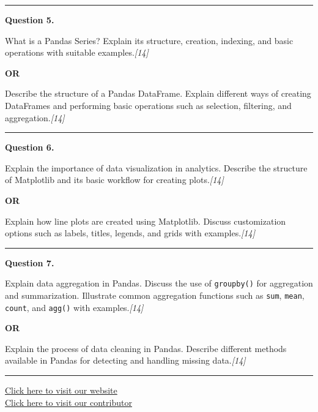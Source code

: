 \documentclass[11pt,a4paper]{article}
\newcommand{\pts}[1]{\hfill   \textit{[#1]}}
\begin{document}
\medskip\rule{\linewidth}{0.2pt}\medskip




\noindent   \textbf{Question 5.}

\begin{parts}
  \item What is a Pandas Series? Explain its structure, creation, indexing, and basic operations with suitable examples.\pts{14}
\end{parts}
\centerline{   \textbf{OR}}

\begin{parts}
  \item Describe the structure of a Pandas DataFrame. Explain different ways of creating DataFrames and performing basic operations such as selection, filtering, and aggregation.\pts{14}
\end{parts}

\medskip\rule{\linewidth}{0.2pt}\medskip




\noindent   \textbf{Question 6.}

\begin{parts}
  \item Explain the importance of data visualization in analytics. Describe the structure of Matplotlib and its basic workflow for creating plots.\pts{14}
\end{parts}
\centerline{   \textbf{OR}}

\begin{parts}
  \item Explain how line plots are created using Matplotlib. Discuss customization options such as labels, titles, legends, and grids with examples.\pts{14}
\end{parts}

\medskip\rule{\linewidth}{0.2pt}\medskip




\noindent   \textbf{Question 7.}

\begin{parts}
  \item Explain data aggregation in Pandas. Discuss the use of   \texttt{groupby()} for aggregation and summarization. Illustrate common aggregation functions such as   \texttt{sum},   \texttt{mean},   \texttt{count}, and   \texttt{agg()} with examples.\pts{14}
\end{parts}
\centerline{   \textbf{OR}}

\begin{parts}
  \item Explain the process of data cleaning in Pandas. Describe different methods available in Pandas for detecting and handling missing data.\pts{14}
\end{parts}

\vfill
\rule{\linewidth}{0.4pt}

\begin{center}\small
\href{https://bhu-exam.vercel.app/}{Click here to visit our website}\\[4pt]
\href{https://me-aryan.vercel.app/}{Click here to visit our contributor}
\end{center}
\end{document}
